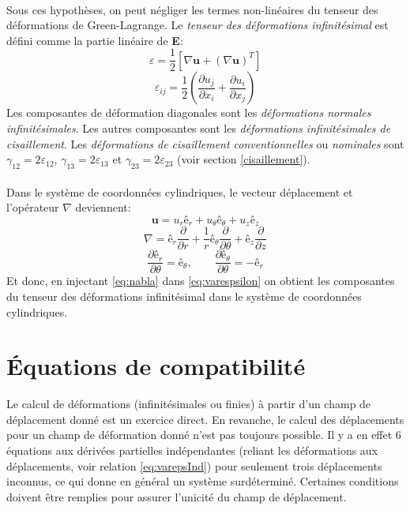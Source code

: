 \paragraph{}
Sous ces hypothèses, on peut négliger les termes non-linéaires du tenseur des déformations de Green-Lagrange. Le \emph{tenseur des déformations infinitésimal} est défini comme la partie linéaire de \textbf{E}:
\begin{equation}
\label{eq:varespsilon}
\varepsilon=\frac{1}{2}[\nabla\textbf{u}+(\nabla\textbf{u})^T]
\end{equation}
\begin{equation}
\label{eq:varepsInd}
\varepsilon_{ij}=\frac{1}{2}\left(\frac{\partial u_j}{\partial x_i}+\frac{\partial u_i}{\partial x_j}\right)
\end{equation}
Les composantes de déformation diagonales sont les \emph{déformations normales infinitésimales}. Les autres composantes sont les \emph{déformations infinitésimales de cisaillement}. Les \emph{déformations de cisaillement conventionnelles} ou \emph{nominales} sont $\gamma_{12}=2\varepsilon_{12}$, $\gamma_{13}=2\varepsilon_{13}$ et $\gamma_{23}=2\varepsilon_{23}$ (voir section \ref{cisaillement}).
\paragraph{}
Dans le système de coordonnées cylindriques, le vecteur déplacement et l'opérateur $\nabla$ deviennent:
$$\textbf{u}=u_r\textbf{ê}_r+u_{\theta}\textbf{ê}_{\theta}+u_z\textbf{ê}_z$$
\begin{equation}\label{eq:nabla}\nabla=\textbf{ê}_r\frac{\partial}{\partial r}+\frac{1}{r}\textbf{ê}_{\theta}\frac{\partial}{\partial \theta}+\textbf{ê}_z\frac{\partial}{\partial z}\end{equation}
$$\frac{\partial \textbf{ê}_r}{\partial \theta}=\textbf{ê}_{\theta},\qquad \frac{\partial \textbf{ê}_{\theta}}{\partial \theta}=-\textbf{ê}_{r} $$
Et donc, en injectant \eqref{eq:nabla} dans \eqref{eq:varespsilon} on obtient les composantes du tenseur des déformations infinitésimal dans le système de coordonnées cylindriques.

\section{\'Equations de compatibilité}
Le calcul de déformations (infinitésimales ou finies) à partir d'un champ de déplacement donné est un exercice direct. En revanche, le calcul des déplacements pour un champ de déformation donné n'est pas toujours possible. Il y a en effet 6 équations aux dérivées partielles indépendantes (reliant les déformations aux déplacements, voir relation \eqref{eq:varepsInd}) pour seulement trois déplacements inconnus, ce qui donne en général un système surdéterminé. Certaines conditions doivent être remplies pour assurer l'unicité du champ de déplacement.
